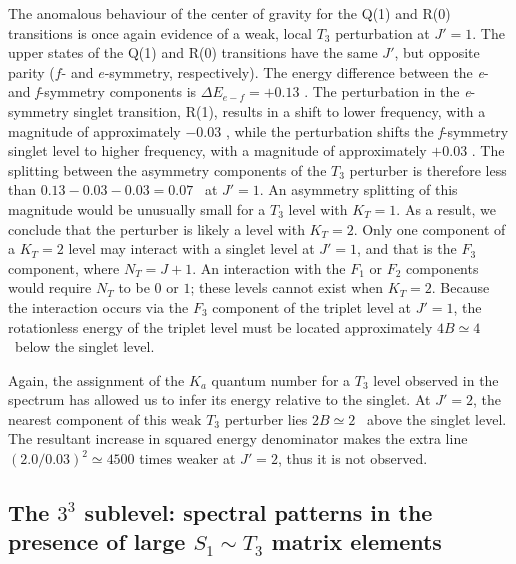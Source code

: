 The anomalous behaviour of the center of gravity for the Q(1) and R(0)
transitions is once again evidence of a weak, local $T_3$ perturbation
at $J'=1$.  The upper states of the Q(1) and R(0) transitions have the
same $J'$, but opposite parity ($f$- and $e$-symmetry, respectively).
The energy difference between the \emph{e}- and \emph{f}-symmetry
components is $\Delta E_{e-f}=+0.13$ \rcm.  The perturbation in the
\emph{e}-symmetry singlet transition, R(1), results in a shift to
lower frequency, with a magnitude of approximately $-0.03$ \rcm, while
the perturbation shifts the \emph{f}-symmetry singlet level to higher
frequency, with a magnitude of approximately $+0.03$ \rcm.  The
splitting between the asymmetry components of the $T_3$ perturber is
therefore less than $0.13-0.03-0.03=0.07$ \rcm\ at $J'=1$.  An
asymmetry splitting of this magnitude would be unusually small for a
$T_3$ level with $K_T=1$.  As a result, we conclude that the perturber
is likely a level with $K_T=2$.  Only one component of a $K_T=2$ level
may interact with a singlet level at $J'=1$, and that is the $F_3$
component, where $N_T=J+1$.  An interaction with the $F_1$ or $F_2$
components would require $N_T$ to be $0$ or $1$; these levels cannot
exist when $K_T=2$.  Because the interaction occurs via the $F_3$
component of the triplet level at $J'=1$, the rotationless energy of
the triplet level must be located approximately $4B \simeq 4$ \rcm\
below the singlet level.

Again, the assignment of the $K_a$ quantum number for a $T_3$ level
observed in the spectrum has allowed us to infer its energy relative
to the singlet.  At $J'=2$, the nearest component of this weak $T_3$
perturber lies $2B \simeq 2$ \rcm\ above the singlet level.  The
resultant increase in squared energy denominator makes the
extra line $(2.0/0.03)^2 \simeq 4500$ times weaker at $J'=2$, thus it
is not observed.

%
% 











\subsection{The $3^3$  sublevel: spectral patterns in the
  presence of large $S_1 \sim T_3$ matrix elements}

